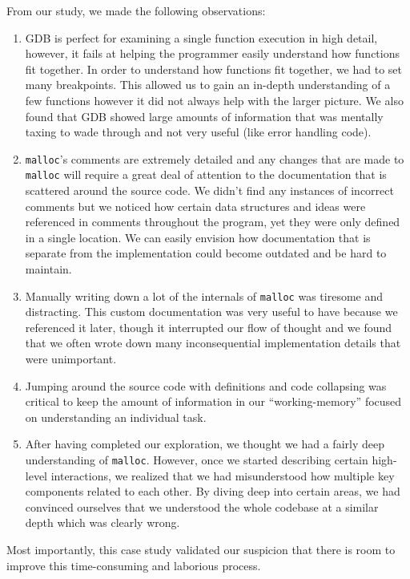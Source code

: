 \noindent From our study, we made the following observations:
\begin{enumerate}
    \item GDB is perfect for examining a single function execution in high detail, however, it fails at helping the programmer easily understand how functions fit together. In order to understand how functions fit together, we had to set many breakpoints. This allowed us to gain an in-depth understanding of a few functions however it did not always help with the larger picture. We also found that GDB showed large amounts of information that was mentally taxing to wade through and not very useful (like error handling code).
    \item \texttt{malloc}'s comments are extremely detailed and any changes that are made to \texttt{malloc} will require a great deal of attention to the documentation that is scattered around the source code. We didn't find any instances of incorrect comments but we noticed how certain data structures and ideas were referenced in comments throughout the program, yet they were only defined in a single location. We can easily envision how documentation that is separate from the implementation could become outdated and be hard to maintain.
    \item Manually writing down a lot of the internals of \texttt{malloc} was tiresome and distracting. This custom documentation was very useful to have because we referenced it later, though it interrupted our flow of thought and we found that we often wrote down many inconsequential implementation details that were unimportant.
    \item Jumping around the source code with definitions and code collapsing was critical to keep the amount of information in our ``working-memory'' focused on understanding an individual task.
    \item After having completed our exploration, we thought we had a fairly deep understanding of \texttt{malloc}. However, once we started describing certain high-level interactions, we realized that we had misunderstood how multiple key components related to each other. By diving deep into certain areas, we had convinced ourselves that we understood the whole codebase at a similar depth which was clearly wrong.
\end{enumerate}

Most importantly, this case study validated our suspicion that there is room to improve this time-consuming and laborious process. 
